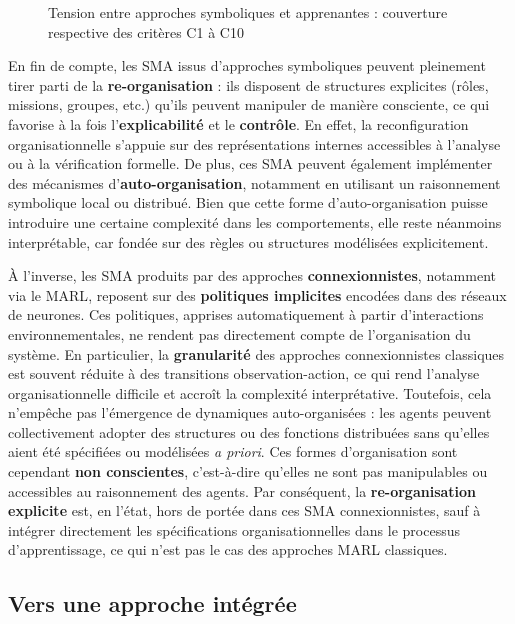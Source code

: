 \begin{figure}[H]
    \centering
    \resizebox{\textwidth}{!}{%
        
    }
    \caption{Tension entre approches symboliques et apprenantes : couverture respective des critères C1 à C10}
    \label{fig:tension-symbolic-learning}
\end{figure}

En fin de compte, les \ac{SMA} issus d'approches symboliques peuvent pleinement tirer parti de la \textbf{re-organisation} : ils disposent de structures explicites (rôles, missions, groupes, etc.) qu'ils peuvent manipuler de manière consciente, ce qui favorise à la fois l'\textbf{explicabilité} et le \textbf{contrôle}. En effet, la reconfiguration organisationnelle s'appuie sur des représentations internes accessibles à l'analyse ou à la vérification formelle. De plus, ces \ac{SMA} peuvent également implémenter des mécanismes d'\textbf{auto-organisation}, notamment en utilisant un raisonnement symbolique local ou distribué. Bien que cette forme d'auto-organisation puisse introduire une certaine complexité dans les comportements, elle reste néanmoins interprétable, car fondée sur des règles ou structures modélisées explicitement.

À l'inverse, les \ac{SMA} produits par des approches \textbf{connexionnistes}, notamment via le \ac{MARL}, reposent sur des \textbf{politiques implicites} encodées dans des réseaux de neurones. Ces politiques, apprises automatiquement à partir d'interactions environnementales, ne rendent pas directement compte de l'organisation du système. En particulier, la \textbf{granularité} des approches connexionnistes classiques est souvent réduite à des transitions observation-action, ce qui rend l'analyse organisationnelle difficile et accroît la complexité interprétative. Toutefois, cela n'empêche pas l'émergence de dynamiques auto-organisées : les agents peuvent collectivement adopter des structures ou des fonctions distribuées sans qu'elles aient été spécifiées ou modélisées \textit{a priori}. Ces formes d'organisation sont cependant \textbf{non conscientes}, c'est-à-dire qu'elles ne sont pas manipulables ou accessibles au raisonnement des agents. Par conséquent, la \textbf{re-organisation explicite} est, en l'état, hors de portée dans ces \ac{SMA} connexionnistes, sauf à intégrer directement les spécifications organisationnelles dans le processus d'apprentissage, ce qui n'est pas le cas des approches \ac{MARL} classiques.

\subsection*{Vers une approche intégrée}

